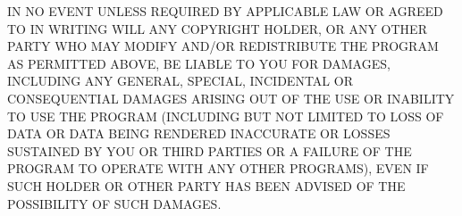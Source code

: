 IN NO EVENT UNLESS REQUIRED BY APPLICABLE LAW OR AGREED TO IN WRITING WILL ANY
COPYRIGHT HOLDER, OR ANY OTHER PARTY WHO MAY MODIFY AND/OR REDISTRIBUTE THE
PROGRAM AS PERMITTED ABOVE, BE LIABLE TO YOU FOR DAMAGES, INCLUDING ANY
GENERAL, SPECIAL, INCIDENTAL OR CONSEQUENTIAL DAMAGES ARISING OUT OF THE USE
OR INABILITY TO USE THE PROGRAM (INCLUDING BUT NOT LIMITED TO LOSS OF DATA OR
DATA BEING RENDERED INACCURATE OR LOSSES SUSTAINED BY YOU OR THIRD PARTIES OR
A FAILURE OF THE PROGRAM TO OPERATE WITH ANY OTHER PROGRAMS), EVEN IF SUCH
HOLDER OR OTHER PARTY HAS BEEN ADVISED OF THE POSSIBILITY OF SUCH DAMAGES. 
